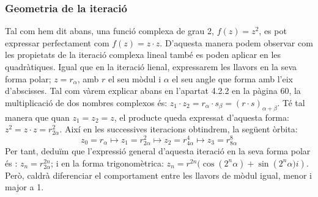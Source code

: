 \documentclass[12pt]{report}
\begin{document}
\subsubsection{Geometria de la iteració}
Tal com hem dit abans, una funció complexa de grau 2, $f(z)=z^2$, es pot expressar perfectament com $f(z)=z \cdot z$. D'aquesta manera podem observar com les propietats de la iteració complexa lineal també es poden aplicar en les quadràtiques.
\newline
Igual que en la iteració lienal, expressarem les llavors en la seva forma polar; $z=r_\alpha$, amb
$r$ el seu mòdul i $\alpha$ el seu angle que forma amb l'eix d'abscisses.
\newline
Tal com vàrem explicar abans en l'apartat 4.2.2 en la pàgina 60, la multiplicació de dos nombres complexos és: $z_1 \cdot z_2 = r_\alpha \cdot s_\beta = (r \cdot s)_{\alpha+\beta}$. Té tal manera que quan $z_1 = z_2 =z$, el producte queda expressat d'aquesta forma: $z^2 = z \cdot z = r^2_{2\alpha}$. Així en les successives iteracions obtindrem, la següent òrbita:
$$z_0 = r_\alpha \mapsto z_1 = r^2_{2\alpha} \mapsto z_2 = r^4_{4\alpha} \mapsto z_3 = r^8_{8\alpha}$$
Per tant, deduïm que l'expressió general d'aquesta iteració en la seva forma polar és : $z_n=r^{2n}_{2\alpha}$; i en la forma trigonomètrica: $z_n=r^{2n}(\cos({2^n\alpha}) + \sin({2^n\alpha )i})$.
\newline
Però, caldrà diferenciar el comportament entre les llavors de mòdul igual, menor i major a 1.
\end{document}
